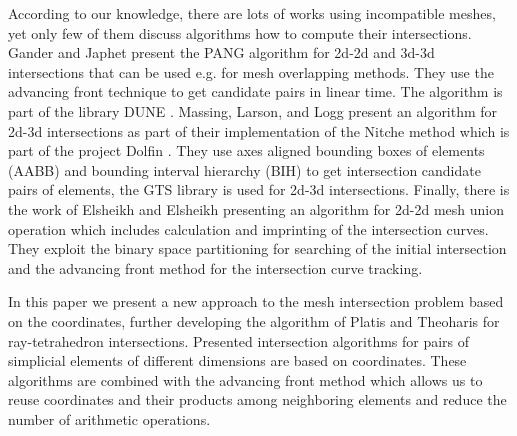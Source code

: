 
According to our knowledge, there are lots of works using incompatible meshes, yet only few of them discuss algorithms how to compute their intersections. 
Gander and Japhet \cite{gander_algorithm_2013} present the PANG algorithm for 2d-2d and 3d-3d intersections that can be used e.g. for mesh overlapping methods.
They use the advancing front technique to get candidate pairs in linear time. The algorithm is part of the library DUNE \cite{bastian_towards_2005}.
Massing, Larson, and Logg \cite{massing_efficient_2013} present an algorithm for 2d-3d intersections as part of their implementation of the Nitche method 
which is part of the project Dolfin \cite{dolphin_2012}. They use axes aligned bounding boxes of elements (AABB) and bounding interval hierarchy (BIH) 
to get intersection candidate pairs of elements, the GTS library \cite{gtslib} is used for 2d-3d intersections. 
Finally, there is the work of Elsheikh and Elsheikh \cite{elsheikh_reliable_2012} presenting an algorithm for 2d-2d mesh union operation which includes 
calculation and imprinting of the intersection curves. They exploit the binary space partitioning for searching of the initial intersection and 
the advancing front method for the intersection curve tracking. 

In this paper we present a new approach to the mesh intersection problem based on the \plucker coordinates,
further developing the algorithm of Platis and Theoharis \cite{platis_fast_2003} for ray-tetrahedron intersections. 
Presented intersection algorithms for pairs of simplicial elements of different dimensions are based on \plucker coordinates.
These algorithms are combined with the advancing front method which allows us to reuse \plucker coordinates and their products among neighboring
elements and reduce the number of arithmetic operations. 

